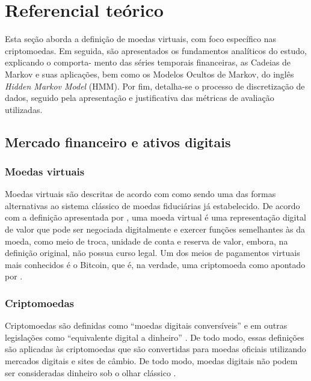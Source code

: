 \documentclass[
    12pt,                %
    openright,           %
    oneside,             %
    a4paper,             %
    english,             %
    brazil               %
]{abntex2}
\begin{document}
\section{Referencial teórico}
\label{sec:referencial}

Esta seção aborda a definição de moedas virtuais, com foco específico nas criptomoedas.
Em seguida, são apresentados os fundamentos analíticos do estudo, explicando o comporta-
mento das séries temporais financeiras, as Cadeias de Markov e suas aplicações, bem como
os Modelos Ocultos de Markov, do inglês \textit{Hidden Markov Model} (HMM). Por fim, detalha-se o processo de discretização de
dados, seguido pela apresentação e justificativa das métricas de avaliação utilizadas.

\subsection{Mercado financeiro e ativos digitais}

\subsubsection{Moedas virtuais}

Moedas virtuais são descritas de acordo com  como sendo uma das
formas alternativas ao sistema clássico de moedas fiduciárias já estabelecido. De acordo
com a definição apresentada por , uma moeda virtual é
uma representação digital de valor que pode ser negociada digitalmente e exercer funções
semelhantes às da moeda, como meio de troca, unidade de conta e reserva de valor, embora,
na definição original, não possua curso legal. Um dos meios de pagamentos virtuais mais
conhecidos é o Bitcoin, que é, na verdade, uma criptomoeda como apontado por .

\subsubsection{Criptomoedas}

Criptomoedas são definidas como ``moedas digitais conversíveis'' e em outras legislações
como ``equivalente digital a dinheiro'' \cite{papadopoulos2024blockchain}. De todo modo, essas
definições são aplicadas às criptomoedas que são convertidas para moedas oficiais utilizando
mercados digitais e sites de câmbio. De todo modo, moedas digitais não podem ser
consideradas dinheiro sob o olhar clássico \cite{papadopoulos2024blockchain}.
\end{document}
